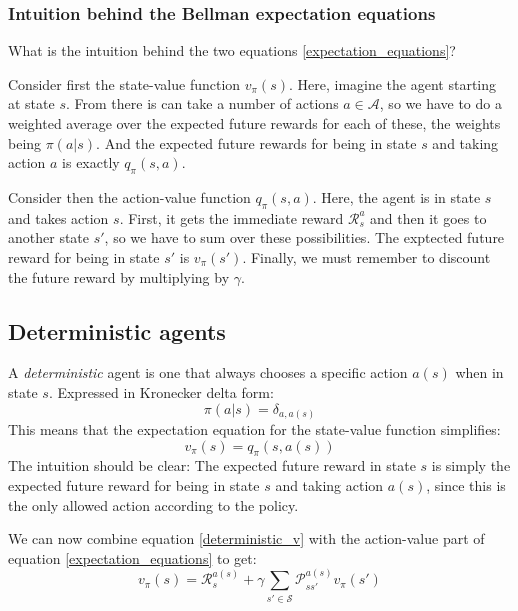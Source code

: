 \documentclass[12pt, a4paper]{article}
\numberwithin{equation}{section}
\begin{document}
\subsubsection{Intuition behind the Bellman expectation equations}
What is the intuition behind the two equations \ref{expectation_equations}?

Consider first the state-value function $v_\pi(s)$. Here, imagine the agent starting at state $s$. From there is can take a number of actions $a\in\mathcal{A}$, so we have to do a weighted average over the expected future rewards for each of these, the weights being $\pi(a|s)$. And the expected future rewards for being in state $s$ and taking action $a$ is exactly $q_\pi(s,a)$.

Consider then the action-value function $q_\pi(s,a)$. Here, the agent is in state $s$ and takes action $s$. First, it gets the immediate reward $\mathcal{R}^a_s$ and then it goes to another state $s'$, so we have to sum over these possibilities. The exptected future reward for being in state $s'$ is $v_\pi(s')$. Finally, we must remember to discount the future reward by multiplying by $\gamma$.

\subsection{Deterministic agents}
A \textit{deterministic} agent is one that always chooses a specific action $a(s)$ when in state $s$. Expressed in Kronecker delta form:
\begin{equation}
\pi(a|s)=\delta_{a,a(s)}
\end{equation}
This means that the expectation equation for the state-value function simplifies:
\begin{equation}
v_\pi(s)=q_\pi(s,a(s))
\label{deterministic_v}
\end{equation}
The intuition should be clear: The expected future reward in state $s$ is simply the expected future reward for being in state $s$ and taking action $a(s)$, since this is the only allowed action according to the policy.

We can now combine equation \ref{deterministic_v} with the action-value part of equation \ref{expectation_equations} to get:
\begin{equation}
v_\pi(s)=\mathcal{R}^{a(s)}_s+\gamma\sum_{s'\in\mathcal{S}}\mathcal{P}^{a(s)}_{ss'}v_\pi(s')
\end{equation}
\end{document}
